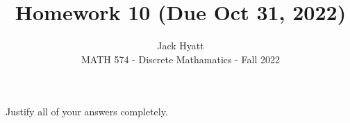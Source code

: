 \documentclass[12pt]{article}
\begin{document}
	
	
	
	\title{Homework 10 (Due Oct 31, 2022)}
	\author{Jack Hyatt\\ %
		MATH 574 - Discrete Mathamatics - Fall 2022} 
	
	\maketitle
	
	Justify all of your answers completely.\\
	
	\renewcommand{\qedsymbol}{$\blacksquare$}

\medskip 
\end{document}

